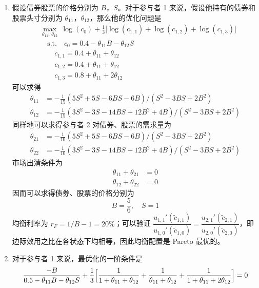 \begin{solution}
\begin{enumerate}[label=(\alph*)]
    \item 假设债券股票的价格分别为 $B$，$S$。对于参与者 1 来说，假设他持有的债券和股票头寸分别为 $\theta_{11}$，$\theta_{12}$，那么他的优化问题是
    \[
        \begin{aligned}
            &\max_{\theta_{11},\,\theta_{12}}\ \log(c_{0})+\tfrac13\bigl[\log(c_{1,1})+\log(c_{1,2})+\log(c_{1,3})\bigr]\\
            &\quad\text{s.t.}\quad c_{0}=0.4-\theta_{11}B-\theta_{12}S\\
            &\qquad c_{1,1}=0.4+\theta_{11}+\theta_{12}\\
            &\qquad c_{1,2}=0.4+\theta_{11}+\theta_{12}\\
            &\qquad c_{1,3}=0.8+\theta_{11}+2\theta_{12}
        \end{aligned}
    \]
    可以求得
    \[
        \begin{aligned}
            \theta_{11}&=-\frac{1}{15}(5S^{2}+5S-6BS-6B)/(S^{2}-3BS+2B^{2})\\
            \theta_{12}&=-\frac{1}{15}(3S^{2}-3S-14BS+12B^{2}+4B)/(S^{2}-3BS+2B^{2})
        \end{aligned}
    \]
    同样地可以求得参与者 2 对债券、股票的需求量为
    \[
        \begin{aligned}
            \theta_{21}&=-\frac{1}{10}(5S^{2}+5S-6BS-6B)/(S^{2}-3BS+2B^{2})\\
            \theta_{22}&=-\frac{1}{10}(3S^{2}-3S-14BS+12B^{2}+4B)/(S^{2}-3BS+2B^{2})
        \end{aligned}
    \]
    市场出清条件为
    \[
        \begin{aligned}
            \theta_{11}+\theta_{21}&=0\\
            \theta_{12}+\theta_{22}&=0
        \end{aligned}
    \]
    因而可以求得债券、股票的价格分别为
    \[
        B=\frac{5}{6},\quad S=1
    \]
    均衡利率为 $r_{F}=1/B-1=20\%$；可以验证 $\dfrac{u_{1,1}'(\tilde{c}_{1,1})}{u_{1,0}'(\tilde{c}_{1,0})}=\dfrac{u_{2,1}'(\tilde{c}_{2,1})}{u_{2,0}'(\tilde{c}_{2,0})}$，即边际效用之比在各状态下均相等，因此均衡配置是 Pareto 最优的。
    \item 对于参与者 1 来说，最优化的一阶条件是
    \[
        \begin{aligned}
            \frac{-B}{0.5-\theta_{11}B-\theta_{12}S}+\frac13\Bigl[\frac{1}{1+\theta_{11}+\theta_{12}}+\frac{1}{\theta_{11}+\theta_{12}}+\frac{1}{1+\theta_{11}+2\theta_{12}}\Bigr]&=0\\

\end{aligned}\]
\end{enumerate}
\end{solution}
